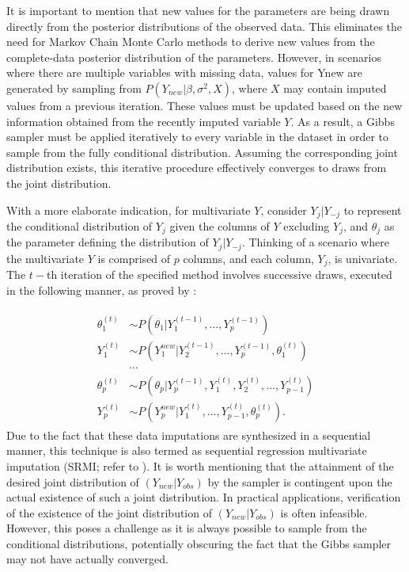 It is important to mention that new values for the parameters are being drawn directly from the posterior distributions of the observed data. This eliminates the need for Markov Chain Monte Carlo methods to derive new values from the complete-data posterior distribution of the parameters. However, in scenarios where there are multiple variables with missing data, values for Ynew are generated by sampling from $P(Y_{new} | \beta, \sigma^2, X)$, where $X$ may contain imputed values from a previous iteration. These values must be updated based on the new information obtained from the recently imputed variable $Y$. As a result, a Gibbs sampler must be applied iteratively to every variable in the dataset in order to sample from the fully conditional distribution. Assuming the corresponding joint distribution exists, this iterative procedure effectively converges to draws from the joint distribution.


With a more elaborate indication, for multivariate $Y$, consider $Y_{j}|Y_{−j}$ to represent the conditional distribution of $Y_{j}$ given the columns of $Y$ excluding $Y_{j}$, and $\theta_{j}$ as the parameter defining the distribution of $Y_{j}|Y_{-j}$. Thinking of a scenario where the multivariate $Y$ is comprised of $p$ columns, and each column, $Y_j$, is univariate. The $t-$th iteration of the specified method involves successive draws, executed in the following manner, as proved by \citet{drechsler2011synthetic}:

\begin{align}
\label{eqn:eqlabel}
\begin{split}
    \theta_{1}^{(t)} &\sim P(\theta_{1}|Y_{1}^{(t-1)},...,Y_{p}^{(t-1)})\\
    Y_{1}^{(t)} &\sim P(Y_{1}^{new}|Y_{2}^{(t-1)},...,Y_{p}^{(t-1)}, \theta_{1}^{(t)})\\
    &\cdots \\
    \theta_{p}^{(t)} &\sim P(\theta_{p}|Y_{p}^{(t-1)},Y_{1}^{(t)},Y_{2}^{(t)},...,Y_{p-1}^{(t)})\\
    Y_{p}^{(t)} &\sim P(Y_{p}^{new}|Y_{1}^{(t)},...,Y_{p-1}^{(t)}, \theta_{p}^{(t)}).
\end{split}
\end{align}
Due to the fact that these data imputations are synthesized in a sequential manner, this technique is also termed as sequential regression multivariate imputation (SRMI; refer to \cite{raghu2001information}). It is worth mentioning that the attainment of the desired joint distribution of $(Y_{new}|Y_{obs})$ by the sampler is contingent upon the actual existence of such a joint distribution. In practical applications, verification of the existence of the joint distribution of $(Y_{new}|Y_{obs})$ is often infeasible. However, this poses a challenge as it is always possible to sample from the conditional distributions, potentially obscuring the fact that the Gibbs sampler may not have actually converged.


